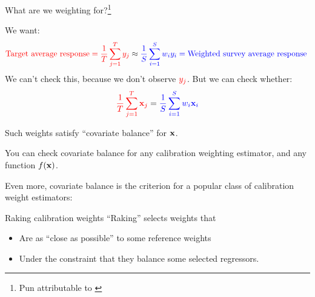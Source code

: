 
\begin{frame}[t]{What are we weighting for?\footnote{Pun attributable to \textcite{solon:2015:weightingfor}}}


We want:
$$
\textcolor{red}{\textrm{Target average response} =
\frac{1}{T} \sum_{j=1}^T y_j} \approx \textcolor{blue}{\frac{1}{S} \sum_{i=1}^S w_i y_i
= \textrm{Weighted survey average response }}
$$
We can't check this, because we don't observe $\textcolor{red}{y_j}$.  \pause But we can check whether:
$$
    \textcolor{red}{\frac{1}{T} \sum_{j=1}^T \mathbf{x}_j} = \textcolor{blue}{\frac{1}{S} \sum_{i=1}^S w_i \mathbf{x}_i}
$$

Such weights satisfy ``covariate balance'' for $\mathbf{x}$.

You can check covariate balance for any calibration weighting estimator,
and any function $f(\mathbf{x})$.

\pause
Even more, covariate balance is the criterion for a popular class of calibration
weight estimators:

\begin{block}{Raking calibration weights}
``Raking'' selects weights that
%
\begin{itemize}
    \item Are as ``close as possible'' to some reference weights
    \item Under the constraint that they balance some selected regressors.
\end{itemize}
%
\end{block}



\end{frame}





